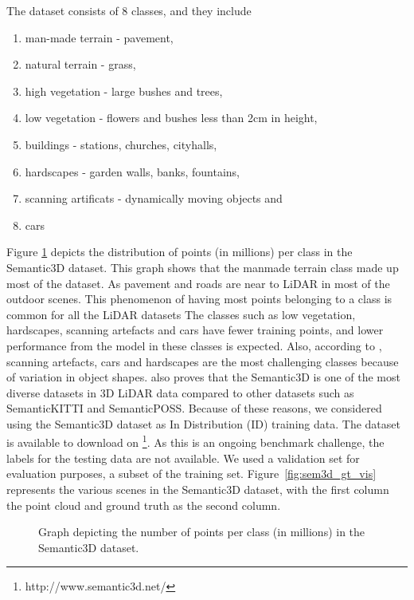     The dataset consists of 8 classes, and they include
\begin{enumerate}
    \item man-made terrain - pavement,
    \item natural terrain - grass,
    \item high vegetation - large bushes and trees,
    \item low vegetation - flowers and bushes less than 2cm in height,
    \item buildings - stations, churches, cityhalls,
    \item hardscapes - garden walls, banks, fountains,
    \item scanning artificats - dynamically moving objects and
    \item cars
\end{enumerate}
Figure \ref{fig:sem3ddist} depicts the distribution of points (in millions) per class in the Semantic3D dataset.
This graph shows that the manmade terrain class made up most of the dataset.
As pavement and roads are near to LiDAR in most of the outdoor scenes.
This phenomenon of having most points belonging to a class is common for all the LiDAR datasets 
The classes such as low vegetation, hardscapes, scanning artefacts and cars have fewer training points, and lower performance from the model in these classes is expected.
Also, according to \cite{hackel2017semantic3d}, scanning artefacts, cars and hardscapes are the most challenging classes because of variation in object shapes.
\cite{survey3d} also proves that the Semantic3D is one of the most diverse datasets in 3D LiDAR data compared to other datasets such as SemanticKITTI and SemanticPOSS.
Because of these reasons, we considered using the Semantic3D dataset as In Distribution (ID) training data.
The dataset is available to download on \footnote[1]{http://www.semantic3d.net/}. 
As this is an ongoing benchmark challenge, the labels for the testing data are not available.
We used a validation set for evaluation purposes, a subset of the training set.
Figure~\ref{fig:sem3d_gt_vis} represents the various scenes in the Semantic3D dataset, with the first column the point cloud and ground truth as the second column.
\begin{figure}[h!]
    \centering
    
    \caption{Graph depicting the number of points per class (in millions) in the Semantic3D dataset.}
    \label{fig:sem3ddist}
\end{figure}


